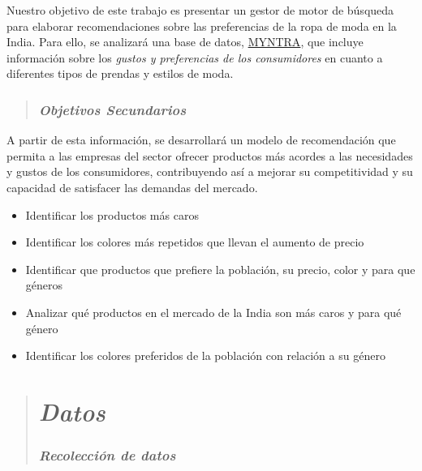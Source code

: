 \documentclass[
]{article}
\providecommand{\tightlist}{%
  \setlength{\itemsep}{0pt}\setlength{\parskip}{0pt}}
\begin{document}
Nuestro objetivo de este trabajo es presentar un gestor de motor de
búsqueda para elaborar recomendaciones sobre las preferencias de la ropa
de moda en la India. Para ello, se analizará una base de datos,
\href{BaseDatos}{MYNTRA}, que incluye información sobre los \emph{gustos
y preferencias de los consumidores} en cuanto a diferentes tipos de
prendas y estilos de moda.

\begin{quote}
\hypertarget{objetivos-secundarios}{%
\subsubsection{\texorpdfstring{\textbf{\emph{Objetivos
Secundarios}}}{Objetivos Secundarios}}\label{objetivos-secundarios}}
\end{quote}

A partir de esta información, se desarrollará un modelo de recomendación
que permita a las empresas del sector ofrecer productos más acordes a
las necesidades y gustos de los consumidores, contribuyendo así a
mejorar su competitividad y su capacidad de satisfacer las demandas del
mercado.

\begin{itemize}
\tightlist
\item
  Identificar los productos más caros
\item
  Identificar los colores más repetidos que llevan el aumento de precio
\item
  Identificar que productos que prefiere la población, su precio, color
  y para que géneros
\item
  Analizar qué productos en el mercado de la India son más caros y para
  qué género
\item
  Identificar los colores preferidos de la población con relación a su
  género
\end{itemize}

\begin{quote}
\hypertarget{datos}{%
\section{\texorpdfstring{\textbf{\emph{Datos}}}{Datos}}\label{datos}}

\hypertarget{recolecciuxf3n-de-datos}{%
\subsubsection{\texorpdfstring{\textbf{\emph{Recolección de
datos}}}{Recolección de datos}}\label{recolecciuxf3n-de-datos}}
\end{quote}
\end{document}
